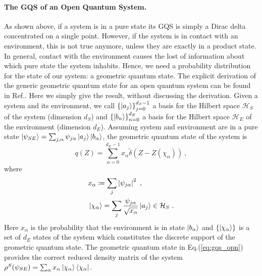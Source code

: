 \documentclass[draft,nofootinbib,pre,twocolumn,showpacs,showkeys,preprintnumbers,floatfix]{revtex4-1}
\newcommand{\1}{\mathbbm{1}}
\begin{document}
\paragraph*{The GQS of an Open Quantum System.}
As shown above, if a system is in a pure state its GQS is simply a Dirac delta concentrated
on a single point. However, if the system is in contact with an environment, this is not true 
anymore, unless they are exactly in a product state. In general, contact with the environment
causes the lost of information about which pure state the system inhabits. Hence, we need a 
probability distribution for the state of our system: a geometric quantum state. The explicit 
derivation of the generic geometric quantum state for an open quantum system can be found 
in Ref.\cite{Anza2020a}. Here we simply give the result, without discussing the derivation. 
Given a system and its environment, we call $\left\{ \ket{a_j}\right\}_{j=0}^{d_S-1}$ a basis for 
the Hilbert space $\mathcal{H}_S$ of the system (dimension $d_S$) and 
$\left\{ \ket{b_n}\right\}_{n=0}^{d_E}$ a basis for the Hilbert space $\mathcal{H}_E$ 
of the environment (dimension $d_E$). Assuming system and environment are in 
a pure state $\ket{\psi_{SE}} = \sum_{j,\alpha}\psi_{j\alpha}\ket{a_j}\ket{b_\alpha}$, the 
geometric quantum state of the system is
\begin{equation}
q(Z) = \sum_{\alpha=0}^{d_E-1} x_\alpha \widetilde{\delta}\left( Z-Z(\chi_\alpha)\right)~,\label{eq:gqs_opn}
\end{equation}
where 
\begin{subequations}\label{eq:def_xchi}
\begin{align}
&x_\alpha \coloneqq \sum_j \left\vert \psi_{j\alpha}\right\vert^2~,\\
&\ket{\chi_\alpha} = \sum_j \frac{\psi_{j\alpha}}{\sqrt{x_\alpha}}\ket{a_j}\in \mathcal{H}_S~.
\end{align}
\end{subequations}
Here $x_\alpha$ is the probability that the environment is in state $\ket{b_\alpha}$ and $\left\{\ket{\chi_\alpha}\right\}$ 
is a set of $d_E$ states of the system which constitutes the discrete support of the geometric 
quantum state. The geometric quantum state in Eq.(\ref{eq:gqs_opn}) provides the correct reduced density matrix of the system
$\rho^{S}(\psi_{SE}) = \sum_\alpha x_\alpha \ket{\chi_\alpha}\bra{\chi_\alpha}$.
\end{document}
